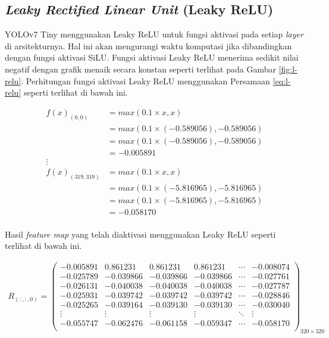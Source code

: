     \subsection{\textit{Leaky Rectified Linear Unit} (Leaky ReLU)}

    YOLOv7 Tiny menggunakan Leaky ReLU untuk fungsi aktivasi pada setiap \textit{layer} di arsitekturnya. Hal ini akan mengurangi waktu komputasi jika dibandingkan dengan fungsi aktivasi SiLU. Fungsi aktivasi Leaky ReLU menerima sedikit nilai negatif dengan grafik menaik secara konstan seperti terlihat pada Gambar \ref{fig:l-relu}. Perhitungan fungsi aktivasi Leaky ReLU menggunakan Persamaan \ref{eq:l-relu} seperti terlihat di bawah ini.

    \begin{align*}
        f(x)_{(0, 0)}       &= max(0.1\times x, x) \\
                            &= max(0.1\times (-0.589056), -0.589056) \\
                            &= max(0.1\times (-0.589056), -0.589056) \\
                            &= -0.005891 \\
        \vdots \\
        f(x)_{(319, 319)}   &= max(0.1\times x, x) \\
                            &= max(0.1\times (-5.816965), -5.816965) \\
                            &= max(0.1\times (-5.816965), -5.816965) \\
                            &= -0.058170 \\
    \end{align*}

    Hasil \textit{feature map} yang telah diaktivasi menggunakan Leaky ReLU seperti terlihat di bawah ini.

    \begin{align*}
        R_{(:, :, 0)} = 
        \begin{pmatrix}
            -0.005891 & 0.861231  & 0.861231  & 0.861231  & \cdots & -0.008074 \\
            -0.025789 & -0.039866 & -0.039866 & -0.039866 & \cdots & -0.027761 \\
            -0.026131 & -0.040038 & -0.040038 & -0.040038 & \cdots & -0.027787 \\
            -0.025931 & -0.039742 & -0.039742 & -0.039742 & \cdots & -0.028846 \\
            -0.025265 & -0.039164 & -0.039130 & -0.039130 & \cdots & -0.030040 \\
            \vdots    & \vdots    & \vdots    & \vdots    & \ddots & \vdots \\
            -0.055747 & -0.062476 & -0.061158 & -0.059347 & \cdots & -0.058170 \\
        \end{pmatrix}_{320\times 320}
    \end{align*}

